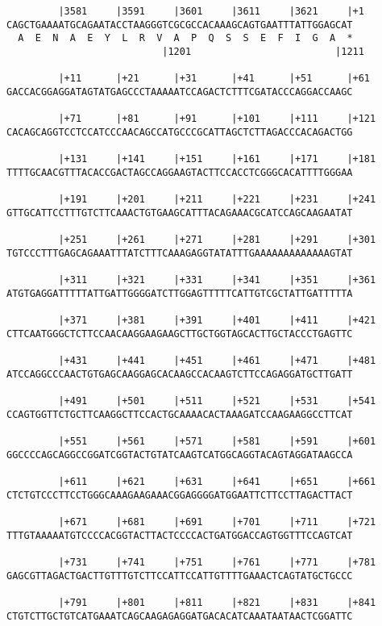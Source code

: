 \documentclass{article}
\begin{document}
\begin{Verbatim}
         |3581     |3591     |3601     |3611     |3621     |+1
CAGCTGAAAATGCAGAATACCTAAGGGTCGCGCCACAAAGCAGTGAATTTATTGGAGCAT
  A  E  N  A  E  Y  L  R  V  A  P  Q  S  S  E  F  I  G  A  *
                           |1201                         |1211
  
         |+11      |+21      |+31      |+41      |+51      |+61
GACCACGGAGGATAGTATGAGCCCTAAAAATCCAGACTCTTTCGATACCCAGGACCAAGC

         |+71      |+81      |+91      |+101     |+111     |+121
CACAGCAGGTCCTCCATCCCAACAGCCATGCCCGCATTAGCTCTTAGACCCACAGACTGG

         |+131     |+141     |+151     |+161     |+171     |+181
TTTTGCAACGTTTACACCGACTAGCCAGGAAGTACTTCCACCTCGGGCACATTTTGGGAA

         |+191     |+201     |+211     |+221     |+231     |+241
GTTGCATTCCTTTGTCTTCAAACTGTGAAGCATTTACAGAAACGCATCCAGCAAGAATAT

         |+251     |+261     |+271     |+281     |+291     |+301
TGTCCCTTTGAGCAGAAATTTATCTTTCAAAGAGGTATATTTGAAAAAAAAAAAAAGTAT

         |+311     |+321     |+331     |+341     |+351     |+361
ATGTGAGGATTTTTATTGATTGGGGATCTTGGAGTTTTTCATTGTCGCTATTGATTTTTA

         |+371     |+381     |+391     |+401     |+411     |+421
CTTCAATGGGCTCTTCCAACAAGGAAGAAGCTTGCTGGTAGCACTTGCTACCCTGAGTTC

         |+431     |+441     |+451     |+461     |+471     |+481
ATCCAGGCCCAACTGTGAGCAAGGAGCACAAGCCACAAGTCTTCCAGAGGATGCTTGATT

         |+491     |+501     |+511     |+521     |+531     |+541
CCAGTGGTTCTGCTTCAAGGCTTCCACTGCAAAACACTAAAGATCCAAGAAGGCCTTCAT

         |+551     |+561     |+571     |+581     |+591     |+601
GGCCCCAGCAGGCCGGATCGGTACTGTATCAAGTCATGGCAGGTACAGTAGGATAAGCCA

         |+611     |+621     |+631     |+641     |+651     |+661
CTCTGTCCCTTCCTGGGCAAAGAAGAAACGGAGGGGATGGAATTCTTCCTTAGACTTACT

         |+671     |+681     |+691     |+701     |+711     |+721
TTTGTAAAAATGTCCCCACGGTACTTACTCCCCACTGATGGACCAGTGGTTTCCAGTCAT

         |+731     |+741     |+751     |+761     |+771     |+781
GAGCGTTAGACTGACTTGTTTGTCTTCCATTCCATTGTTTTGAAACTCAGTATGCTGCCC

         |+791     |+801     |+811     |+821     |+831     |+841
CTGTCTTGCTGTCATGAAATCAGCAAGAGAGGATGACACATCAAATAATAACTCGGATTC


\end{Verbatim}
\end{document}
